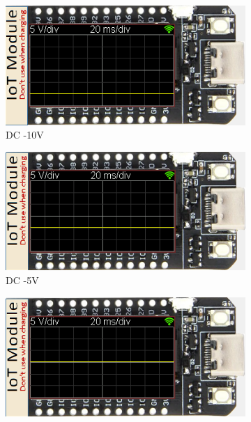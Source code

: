 \begin{figure}[H]
    \centering
    \begin{subfigure}{0.35\textwidth}
        \centering
        \includegraphics[width=1\linewidth]{Imagens/Testes no simulador/DC -10V.png}
        \captionsetup{justification=centering}
        \caption{DC -10V}
        \label{fig:DC -10V simulador}
    \end{subfigure}
    \begin{subfigure}{0.35\textwidth}
        \centering
        \includegraphics[width=1\linewidth]{Imagens/Testes no simulador/DC -5V.png}
        \captionsetup{justification=centering}
        \caption{DC -5V}
        \label{fig:DC -5V simulador}
    \end{subfigure}
    \begin{subfigure}{0.35\textwidth}
        \centering
        \includegraphics[width=1\linewidth]{Imagens/Testes no simulador/DC 0V.png}

\end{subfigure}
\end{figure}
